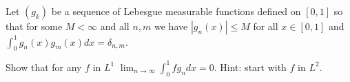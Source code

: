 Let $(g_k)$ be a sequence of Lebesgue measurable functions defined on
$[0,1]$ so that for some $M<\infty$ and all $n,m$ we have
$|g_n(x)|\leq M$ for all $x\in [0,1]$ and
$\int_0^1g_n(x)g_m(x)dx=\delta_{n,m}$.

Show that for any $f$ in $L^1$ $\lim_{n\rightarrow \infty}\int_0^1
fg_n dx=0$. Hint: start with $f$ in $L^2$. 
